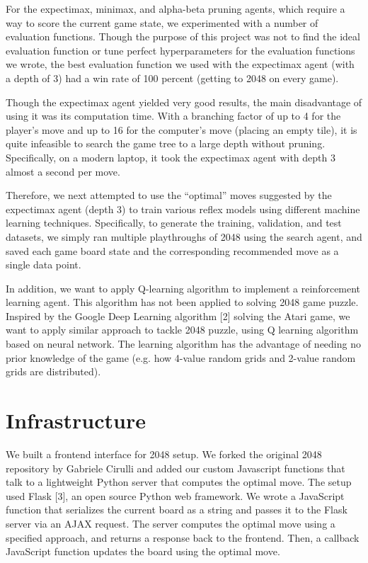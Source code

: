 \documentclass[9pt,twocolumn]{article}
\begin{document}
For the expectimax, minimax, and alpha-beta pruning agents, which require a way to score the current game state, we experimented with a number of evaluation functions. Though the purpose of this project was not to find the ideal evaluation function or tune perfect hyperparameters for the evaluation functions we wrote, the best evaluation function we used with the expectimax agent (with a depth of 3) had a win rate of 100 percent (getting to 2048 on every game).

Though the expectimax agent yielded very good results, the main disadvantage of using it was its computation time. With a branching factor of up to 4 for the player’s move and up to 16 for the computer’s move (placing an empty tile), it is quite infeasible to search the game tree to a large depth without pruning. Specifically, on a modern laptop, it took the expectimax agent with depth 3 almost a second per move. 

Therefore, we next attempted to use the “optimal” moves suggested by the expectimax agent (depth 3) to train various reflex models using different machine learning techniques. Specifically, to generate the training, validation, and test datasets, we simply ran multiple playthroughs of 2048 using the search agent, and saved each game board state and the corresponding recommended move as a single data point.

In addition, we want to apply Q-learning algorithm to implement a reinforcement learning agent. This algorithm has not been applied to solving 2048 game puzzle. Inspired by the Google Deep Learning algorithm [2] solving the Atari game, we want to apply similar approach to tackle 2048 puzzle, using Q learning algorithm based on neural network. The learning algorithm has the advantage of needing no prior knowledge of the game (e.g. how 4-value random grids and 2-value random grids are distributed). 

\section{Infrastructure}

We built a frontend interface for 2048 setup. We forked the original 2048 repository by Gabriele Cirulli and added our custom Javascript functions that talk to a lightweight Python server that computes the optimal move. The setup used Flask [3], an open source Python web framework. We wrote a JavaScript function that serializes the current board as a string and passes it to the Flask server via an AJAX request. The server computes the optimal move using a specified approach, and returns a response back to the frontend. Then, a callback JavaScript function updates the board using the optimal move. 
\end{document}

